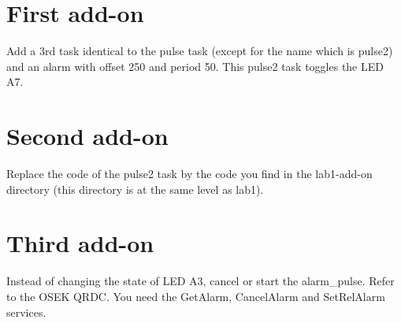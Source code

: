 \documentclass[11pt]{report}
\newcommand{\namedtodo}[2][]{%
{%
\todo[color={yellow!50},size=\small]{%
\textbf{TODO [\uppercase{#1}]:}~#2}%
}}
\newtheorem{ex}{Question}
\begin{document}





\section{First add-on}

Add a 3rd task identical to the pulse task (except for the name which is pulse2) and an alarm with offset 250 and period 50. This pulse2 task toggles the LED A7.

\section{Second add-on}

Replace the code of the pulse2 task by the code you find in the lab1-add-on directory (this directory is at the same level as lab1).

\section{Third add-on}

Instead of changing the state of LED A3, cancel or start the alarm_pulse. Refer to the OSEK QRDC. You need the GetAlarm, CancelAlarm and SetRelAlarm services.



%
\end{document}
